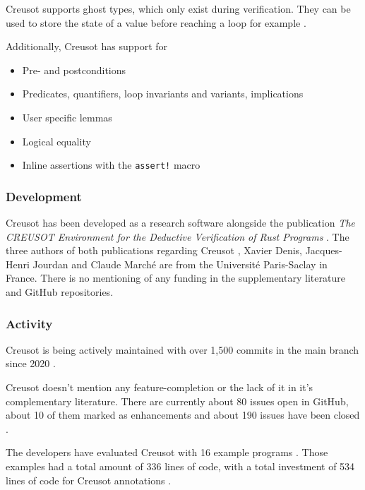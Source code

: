 Creusot supports ghost types, which only exist during verification\cite{riesco_creusot_2022}. They can be used to store the state of a value before reaching a loop for example \cite{riesco_creusot_2022}.

Additionally, Creusot has support for
\begin{itemize}
    \item Pre- and postconditions \cite{riesco_creusot_2022}
    \item Predicates, quantifiers, loop invariants and variants, implications \cite{riesco_creusot_2022}
    \item User specific lemmas \cite{riesco_creusot_2022}
    \item Logical equality \cite{riesco_creusot_2022}
    \item Inline assertions with the \lstinline{assert!} macro
\end{itemize}

\subsubsection{Development}
Creusot has been developed as a research software \cite{xavier_denis_xldeniscreusot_2023} alongside the publication \textit{The CREUSOT Environment for the Deductive Verification of Rust Programs} \cite{denis_creusot_2021}. The three authors of both publications regarding Creusot \cite{denis_creusot_2021,riesco_creusot_2022}, Xavier Denis, Jacques-Henri Jourdan and Claude Marché are from the Université Paris-Saclay in France. There is no mentioning of any funding in the supplementary literature \cite{denis_creusot_2021,riesco_creusot_2022} and GitHub repositories.

\subsubsection{Activity}
Creusot is being actively maintained with over 1,500 commits in the main branch since 2020 \cite{xavier_denis_xldeniscreusot_2023}.

Creusot doesn't mention any feature-completion or the lack of it in it's complementary literature. There are currently about 80 issues open in GitHub, about 10 of them marked as enhancements and about 190 issues have been closed \cite{xavier_denis_issues_2023}.

The developers have evaluated Creusot with 16 example programs \cite{riesco_creusot_2022}. Those examples had a total amount of 336 lines of code, with a total investment of 534 lines of code for Creusot annotations \cite{riesco_creusot_2022}. 

